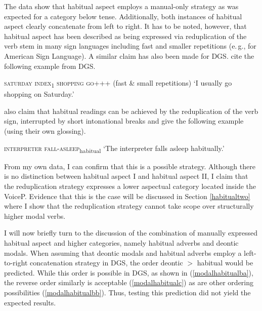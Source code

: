 The data show that habitual aspect employs a manual-only strategy as was expected for a category below tense. Additionally, both instances of habitual aspect clearly concatenate from left to right. It has to be noted, however, that habitual aspect has been described as being expressed via reduplication of the verb stem in many sign languages including fast and smaller repetitions (e.\,g., \citealt{rathmann2005event} for American Sign Language). A similar claim has also been made for DGS. \citet[225]{signgram2017} cite the following example from DGS.

\begin{exe}
\ex \textsc{saturday index\textsubscript{1} shopping go+++} (fast \& small repetitions) 
\glt `I usually go shopping on Saturday.'\label{queretaldgs}
\end{exe}


\noindent \citet[148]{happ2014vork} also claim that habitual readings can be achieved by the reduplication of the verb sign, interrupted by short intonational breaks and give the following example (using their own glossing). 

\begin{exe}
\ex \textsc{interpreter fall-asleep}\textsubscript{habitual} 
\glt `The interpreter falls asleep habitually.'\label{habitualhappvorkoeper}

\end{exe}

\noindent From my own data, I can confirm that this is a possible strategy. Although there is no distinction between habitual aspect I and habitual aspect II, I claim that the reduplication strategy expresses a lower aspectual category located inside the VoiceP. Evidence that this is the case will be discussed in Section \ref{habitualtwo} where I show that the reduplication strategy cannot take scope over structurally higher modal verbs.

I will now briefly turn to the discussion of the combination of manually expressed habitual aspect and higher categories, namely habitual adverbs and deontic modals. When assuming that deontic modals and habitual adverbs employ a left-to-right concatenation strategy in DGS, the order deontic $>$ habitual would be predicted. While this order is possible in DGS, as shown in (\ref{modalhabitualba}), the reverse order similarly is acceptable (\ref{modalhabitualc}) as are other ordering possibilities (\ref{modalhabitualbb}). Thus, testing this prediction did not yield the expected results.

